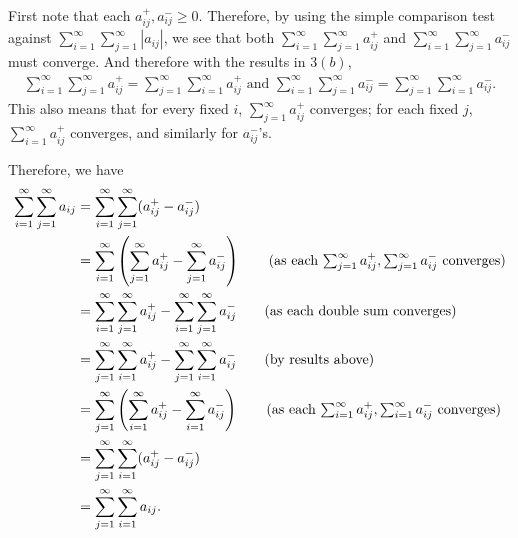 \documentclass[12pt]{article}
\begin{document}
\begin{fproof}[3(c)]
 First note that each \(a_{ij}^+, a_{ij}^- \geq 0\).
 Therefore, by using the simple comparison test against \(\sum_{i=1}^{\infty} \sum_{j=1}^{\infty} |a_{ij}|\), we see that both \(\sum_{i=1}^{\infty}\sum_{j=1}^{\infty} a_{ij}^+ \) and \(\sum_{i=1}^{\infty}\sum_{j=1}^{\infty} a_{ij}^-\) must converge.
 And therefore with the results in \(3(b)\),
 \begin{align*}
    \sum_{i=1}^{\infty}\sum_{j=1}^{\infty} a_{ij}^+ = \sum_{j=1}^{\infty}\sum_{i=1}^{\infty} a_{ij}^+  
    \text{ and } 
    \sum_{i=1}^{\infty}\sum_{j=1}^{\infty} a_{ij}^- = \sum_{j=1}^{\infty}\sum_{i=1}^{\infty} a_{ij}^-.
 \end{align*}
 This also means that for every fixed \(i\), \(\sum_{j=1}^{\infty} a_{ij}^+\) converges; for each fixed \(j\), \(\sum_{i=1}^{\infty} a_{ij}^+\) converges, and similarly for \(a_{ij}^-\)'s.
 
 Therefore, we have
 \begin{align*}
    \sum_{i=1}^{\infty} \sum_{j=1}^{\infty} a_{ij}
    &= \sum_{i=1}^{\infty} \sum_{j=1}^{\infty} (a_{ij}^+ - a_{ij}^-)\\
    & = \sum_{i=1}^{\infty} \pare{\sum_{j=1}^{\infty} a_{ij}^+ - \sum_{j=1}^{\infty}a_{ij}^-} \tag{as each \(\sum_{j=1}^{\infty} a_{ij}^+, \sum_{j=1}^{\infty}a_{ij}^-\) converges}\\
    & = \sum_{i=1}^{\infty}\sum_{j=1}^{\infty}a_{ij}^+ -  \sum_{i=1}^{\infty}\sum_{j=1}^{\infty}a_{ij}^- \tag{as each double sum converges}\\
    & = \sum_{j=1}^{\infty}\sum_{i=1}^{\infty}a_{ij}^+ - \sum_{j=1}^{\infty}\sum_{i=1}^{\infty}a_{ij}^- \tag{by results above}\\
    &= \sum_{j=1}^{\infty} \pare{\sum_{i=1}^{\infty}a_{ij}^+ - \sum_{i=1}^{\infty}a_{ij}^-} \tag{as each \(\sum_{i=1}^{\infty} a_{ij}^+, \sum_{i=1}^{\infty}a_{ij}
    ^-\) converges}\\
    &= \sum_{j=1}^{\infty}\sum_{i=1}^{\infty} (a_{ij}^+ -a_{ij}^- )\\
    &=\sum_{j=1}^{\infty}\sum_{i=1}^{\infty} a_{ij}.
 \end{align*}
 
\end{fproof}
\newpage
\end{document}
